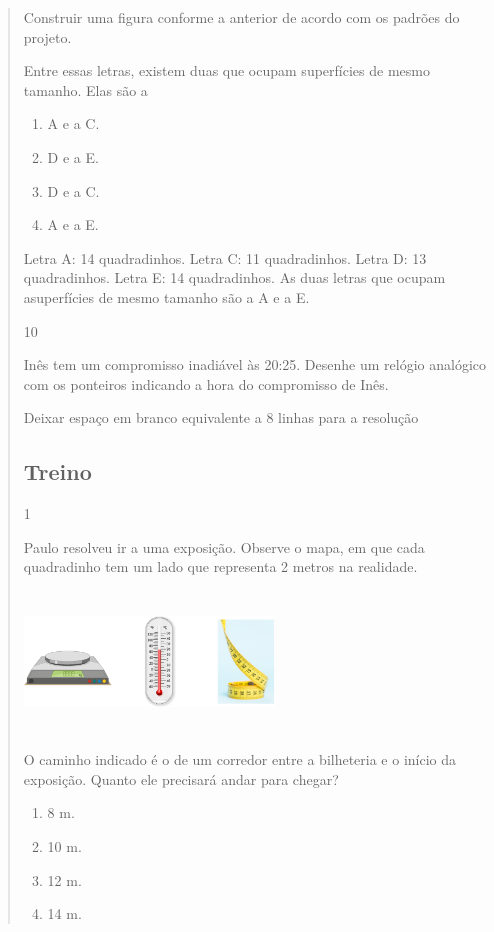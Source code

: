 \begin{mdframed}[linewidth=2pt,linecolor=salmao,roundcorner=2pt]
\begin{itemize}
{\begin{itemize}
\begin{escolha}
{\begin{quote}
Construir uma figura conforme a anterior de acordo com os padrões do
projeto.

Entre essas letras, existem duas que ocupam superfícies de mesmo tamanho. Elas
são a

\begin{enumerate}
\item
  A e a C.
\item
  D e a E.
\item
  D e a C.
\item
  A e a E.
\end{enumerate}

Letra A: 14 quadradinhos.
Letra C: 11 quadradinhos.
Letra D: 13 quadradinhos.
Letra E: 14 quadradinhos.
As duas letras que ocupam asuperfícies de mesmo tamanho são a A e a E.

\num{10}

Inês tem um compromisso inadiável às 20:25. Desenhe um relógio analógico
com os ponteiros indicando a hora do compromisso de Inês.

\Paulo Deixar espaço em branco equivalente a 8 linhas para a resolução



\subsection{Treino}

\num{1}

Paulo resolveu ir a uma exposição. Observe o mapa, em que cada quadradinho tem um lado que representa 2 metros na realidade.

\includegraphics[width=2.60897in,height=1.46587in]{media/image70.png}

O caminho indicado é o de um corredor entre a bilheteria e o início da exposição.
Quanto ele precisará andar para chegar?

\begin{enumerate}
\item
  8 m.
\item
  10 m.
\item
  12 m.
\item
  14 m.
\end{enumerate}


\end{quote}}
\end{escolha}
\end{itemize}}
\end{itemize}
\end{mdframed}
